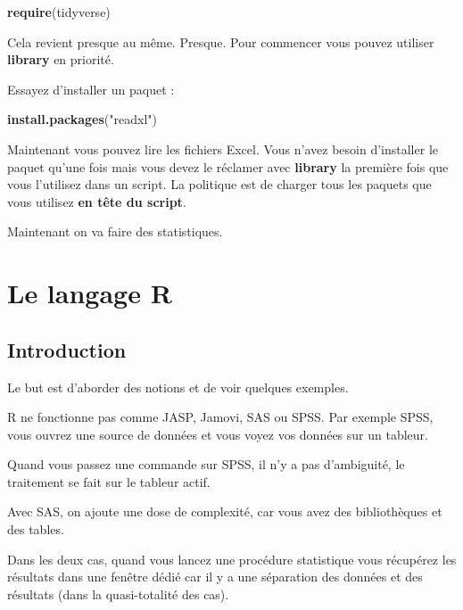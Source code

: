 \documentclass[
]{book}
\newenvironment{Shaded}{\begin{snugshade}}{\end{snugshade}}
\newcommand{\FunctionTok}[1]{\textcolor[rgb]{0.13,0.29,0.53}{\textbf{#1}}}
\newcommand{\NormalTok}[1]{#1}
\newcommand{\StringTok}[1]{\textcolor[rgb]{0.31,0.60,0.02}{#1}}
\begin{document}
\begin{Shaded}
\begin{Highlighting}[]
\FunctionTok{require}\NormalTok{(tidyverse)}
\end{Highlighting}
\end{Shaded}

Cela revient presque au même. Presque. Pour commencer vous pouvez utiliser
\textbf{library} en priorité.

Essayez d'installer un paquet :

\begin{Shaded}
\begin{Highlighting}[]
\FunctionTok{install.packages}\NormalTok{(}\StringTok{"readxl"}\NormalTok{)}
\end{Highlighting}
\end{Shaded}

Maintenant vous pouvez lire les fichiers Excel. Vous n'avez besoin d'installer
le paquet qu'une fois mais vous devez le réclamer avec \textbf{library} la première
fois que vous l'utilisez dans un script. La politique est de charger tous les
paquets que vous utilisez \textbf{en tête du script}.

Maintenant on va faire des statistiques.

\chapter{Le langage R}\label{le-langage-r}

\section{Introduction}\label{introduction}

Le but est d'aborder des notions et de voir quelques exemples.

R ne fonctionne pas comme JASP, Jamovi, SAS ou SPSS. Par exemple SPSS, vous ouvrez une
source de données et vous voyez vos données sur un tableur.

Quand vous passez une commande sur SPSS, il n'y a pas d'ambiguité, le traitement
se fait sur le tableur actif.

Avec SAS, on ajoute une dose de complexité, car vous avez des bibliothèques
et des tables.

Dans les deux cas, quand vous lancez une procédure statistique vous récupérez
les résultats dans une fenêtre dédié car il y a une séparation des données
et des résultats (dans la quasi-totalité des cas).
\end{document}
